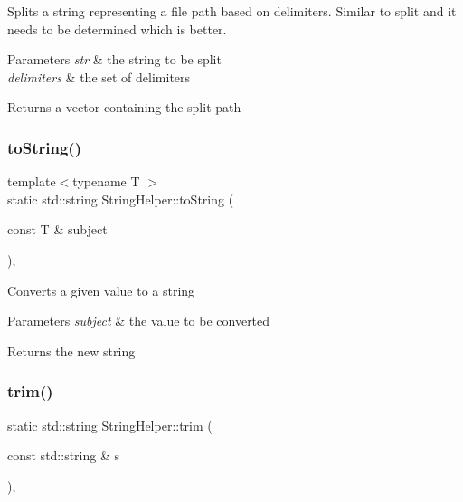 Splits a string representing a file path based on delimiters. Similar to split and it needs to be determined which is better. 
\begin{DoxyParams}{Parameters}
{\em str} & the string to be split \\
\hline
{\em delimiters} & the set of delimiters \\
\hline
\end{DoxyParams}
\begin{DoxyReturn}{Returns}
a vector containing the split path 
\end{DoxyReturn}
\hypertarget{class_string_helper_a0a203a5eed0ff6d62b0a7530dee06386}{}\label{class_string_helper_a0a203a5eed0ff6d62b0a7530dee06386} 
\subsubsection{\texorpdfstring{to\+String()}{toString()}}
{\footnotesize\ttfamily template$<$typename T $>$ \\
static std\+::string String\+Helper\+::to\+String (\begin{DoxyParamCaption}\item[{const T \&}]{subject }\end{DoxyParamCaption})\hspace{0.3cm}{\ttfamily [inline]}, {\ttfamily [static]}}

Converts a given value to a string 
\begin{DoxyParams}{Parameters}
{\em subject} & the value to be converted \\
\hline
\end{DoxyParams}
\begin{DoxyReturn}{Returns}
the new string 
\end{DoxyReturn}
\hypertarget{class_string_helper_a7861a9bf77dd724b5c046e34fe43eaa4}{}\label{class_string_helper_a7861a9bf77dd724b5c046e34fe43eaa4} 
\subsubsection{\texorpdfstring{trim()}{trim()}}
{\footnotesize\ttfamily static std\+::string String\+Helper\+::trim (\begin{DoxyParamCaption}\item[{const std\+::string \&}]{s }\end{DoxyParamCaption})\hspace{0.3cm}{\ttfamily [inline]}, {\ttfamily [static]}}

